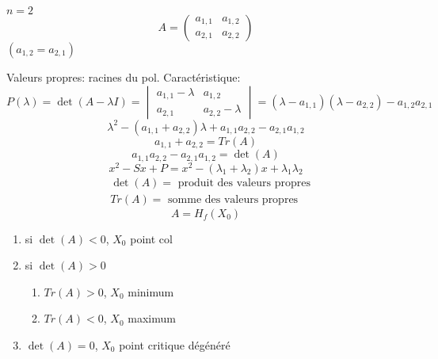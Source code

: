 $n = 2$
 \[
A = \begin{pmatrix} 
    a_{1,1} & a_{1, 2}\\
    a_{2, 1} & a_{2, 2}
\end{pmatrix} 
\] 
$(a_{1,2} = a_{2, 1})$
\par
Valeurs propres: racines du pol. Caractéristique:  
\[
    P(\lambda) = \det(A - \lambda I) = \begin{vmatrix} a_{1,1} - \lambda & a_{1, 2} \\ a_{2, 1} & a_{2,2} - \lambda \end{vmatrix} = (\lambda - a_{1,1})(\lambda - a_{2,2}) -  a_{1,2}a_{2,1}
\] 
\[
    \lambda^2 - (a_{1,1} + a_{2,2})\lambda + a_{1,1}a_{2,2} - a_{2,1}a_{1,2}
\] 
\[
    a_{1,1} + a_{2,2} = Tr(A)
\] 
\[
    a_{1,1}a_{2,2} - a_{2,1}a_{1,2} = \det(A)
\] 
\[
    x^2 - Sx + P = x^2 - (\lambda_1 + \lambda_2)x + \lambda_1\lambda_2
\] 
\begin{align*}
    &\det(A) = \text{ produit des valeurs propres}\\
    &Tr(A) = \text{ somme des valeurs propres}
\end{align*}
\[
A = H_f(X_0)
\] 
\begin{enumerate}
    \item si $\det(A) < 0$,  $X_0$ point col
    \item si $\det(A) > 0$
         \begin{enumerate}
            \item $Tr(A) > 0$, $X_0$ minimum
            \item  $Tr(A) < 0$, $X_0$ maximum
        \end{enumerate}
    \item $\det(A) = 0$,  $X_0$ point critique dégénéré
\end{enumerate}

